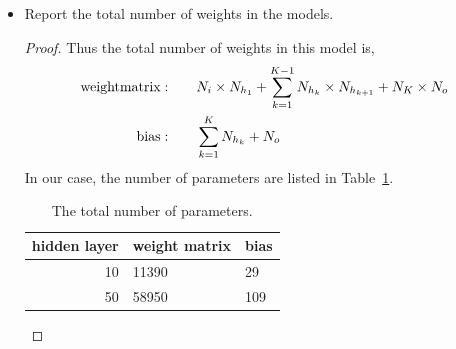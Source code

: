 \documentclass[11pt]{article}
\newcommand{\1}{\mathbf{1}}
\begin{document}
{\begin{itemize}
\begin{proof}
    In our case we choose step size to be {\tt 1e-2}, the number of iterations to be 100,000, batch size to be 50.
  \end{proof}
  \item Report the total number of weights in the models.
  \begin{proof}
    Thus the total number of weights in this model is,
    \begin{align*}
      {\rm weight matrix:} \qquad & N_i\times N_{h_1} + \sum_{k=1}^{K-1} N_{h_k} \times N_{h_{k+1}} + N_{K} \times N_o \\
      {\rm bias:} \qquad  & \sum_{k=1}^K N_{h_k} + N_o
    \end{align*}
    In our case, the number of parameters are listed in Table~\ref{tb:part2:parameters}.
    \begin{table}[htb]
    \centering
    \begin{tabular}{r|l|l}
    \hline
    hidden layer & weight matrix & bias \\
    \hline
    10 & 11390 & 29 \\
    \hline
    50 & 58950 & 109 \\
    \hline
    \end{tabular}
    \caption{The total number of parameters. \label{tb:part2:parameters}}
    \end{table}
  \end{proof}
\end{itemize}
}
\end{document}

